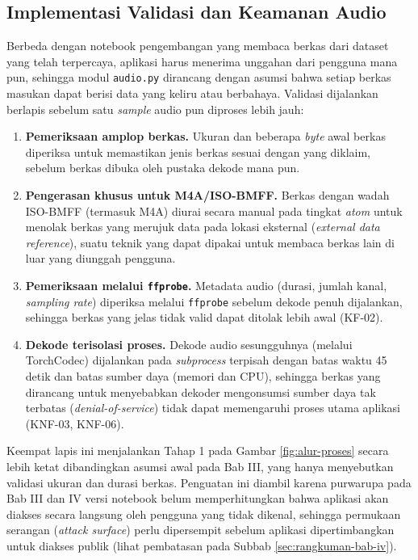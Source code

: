 \subsection{Implementasi Validasi dan Keamanan Audio}
\label{subsec:implementasi-audio}

Berbeda dengan notebook pengembangan yang membaca berkas dari dataset yang telah
terpercaya, aplikasi harus menerima unggahan dari pengguna mana pun, sehingga
modul \texttt{audio.py} dirancang dengan asumsi bahwa setiap berkas masukan
dapat berisi data yang keliru atau berbahaya. Validasi dijalankan berlapis
sebelum satu \textit{sample} audio pun diproses lebih jauh:

\begin{enumerate}
  \item \textbf{Pemeriksaan amplop berkas.} Ukuran dan beberapa \textit{byte}
  awal berkas diperiksa untuk memastikan jenis berkas sesuai dengan yang
  diklaim, sebelum berkas dibuka oleh pustaka dekode mana pun.
  \item \textbf{Pengerasan khusus untuk M4A/ISO-BMFF.} Berkas dengan wadah
  ISO-BMFF (termasuk M4A) diurai secara manual pada tingkat \textit{atom}
  untuk menolak berkas yang merujuk data pada lokasi eksternal (\textit{external
  data reference}), suatu teknik yang dapat dipakai untuk membaca berkas lain
  di luar yang diunggah pengguna.
  \item \textbf{Pemeriksaan melalui \texttt{ffprobe}.} Metadata audio (durasi,
  jumlah kanal, \textit{sampling rate}) diperiksa melalui \texttt{ffprobe}
  sebelum dekode penuh dijalankan, sehingga berkas yang jelas tidak valid dapat
  ditolak lebih awal (KF-02).
  \item \textbf{Dekode terisolasi proses.} Dekode audio sesungguhnya (melalui
  TorchCodec) dijalankan pada \textit{subprocess} terpisah dengan batas waktu 45
  detik dan batas sumber daya (memori dan CPU), sehingga berkas yang dirancang
  untuk menyebabkan dekoder mengonsumsi sumber daya tak terbatas
  (\textit{denial-of-service}) tidak dapat memengaruhi proses utama aplikasi
  (KNF-03, KNF-06).
\end{enumerate}

Keempat lapis ini menjalankan Tahap 1 pada Gambar \ref{fig:alur-proses} secara
lebih ketat dibandingkan asumsi awal pada Bab III, yang hanya menyebutkan
validasi ukuran dan durasi berkas. Penguatan ini diambil karena purwarupa pada
Bab III dan IV versi notebook belum memperhitungkan bahwa aplikasi akan
diakses secara langsung oleh pengguna yang tidak dikenal, sehingga permukaan
serangan (\textit{attack surface}) perlu dipersempit sebelum aplikasi
dipertimbangkan untuk diakses publik (lihat pembatasan pada Subbab
\ref{sec:rangkuman-bab-iv}).

